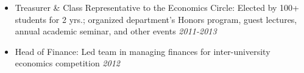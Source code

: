 \documentclass[10pt,a4paper]{article}
\begin{document}
\vspace{-0.6cm}
\vspace{-0.1cm}
\begin{itemize}
	\itemsep-0.20em
\item Treasurer \& Class Representative to the Economics Circle: Elected by 100+ students for 2 yrs.; organized department's Honors program, guest lectures, annual academic seminar, and other events \hfill \textit{2011-2013}
\item Head of Finance: Led team in managing finances for inter-university economics competition \hfill \textit{2012}
\vspace{-0.35em}
\end{itemize}
	
\end{document}
